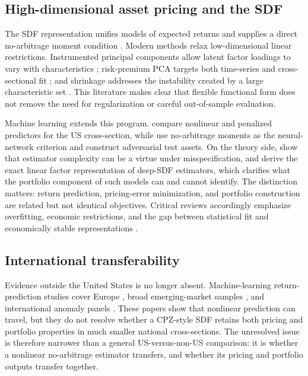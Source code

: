 \documentclass[12pt]{article}
\begin{document}
\subsection{High-dimensional asset pricing and the SDF}

The SDF representation unifies models of expected returns and supplies a direct no-arbitrage moment condition \citep{hj1991,cochrane2005,cochrane2011}. Modern methods relax low-dimensional linear restrictions. Instrumented principal components allow latent factor loadings to vary with characteristics \citep{kps2019}; risk-premium PCA targets both time-series and cross-sectional fit \citep{lettaupelger2020}; and shrinkage addresses the instability created by a large characteristic set \citep{kns2020}. This literature makes clear that flexible functional form does not remove the need for regularization or careful out-of-sample evaluation.

Machine learning extends this program. \citet{gkx2020} compare nonlinear and penalized predictors for the US cross-section, while \citet{cpz2024} use no-arbitrage moments as the neural-network criterion and construct adversarial test assets. On the theory side, \citet{kmz2024} show that estimator complexity can be a virtue under misspecification, and \citet{kellykuznetsov2026} derive the exact linear factor representation of deep-SDF estimators, which clarifies what the portfolio component of such models can and cannot identify. The distinction matters: return prediction, pricing-error minimization, and portfolio construction are related but not identical objectives. Critical reviews accordingly emphasize overfitting, economic restrictions, and the gap between statistical fit and economically stable representations \citep{bagnara2024}.

\subsection{International transferability}

Evidence outside the United States is no longer absent. Machine-learning return-prediction studies cover Europe \citep{drobetzotto2021}, broad emerging-market samples \citep{hanauerkalsbach2023}, and international anomaly panels \citep{azevedo2023}. These papers show that nonlinear prediction can travel, but they do not resolve whether a CPZ-style SDF retains both pricing and portfolio properties in much smaller national cross-sections. The unresolved issue is therefore narrower than a general US-versus-non-US comparison: it is whether a nonlinear no-arbitrage estimator transfers, and whether its pricing and portfolio outputs transfer together.
\end{document}
